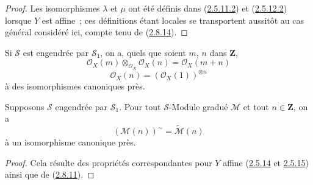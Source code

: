 \begin{proof}
Les isomorphismes $\lambda$ et $\mu$ ont été définis dans
(\hyperref[II.2.5.11.2-fr]{2.5.11.2}) et
(\hyperref[II.2.5.12.2-fr]{2.5.12.2}) lorsque $Y$ est affine~; ces définitions
étant locales se transportent aussitôt au cas général considéré ici, compte
tenu de (\hyperref[II.2.8.14-fr]{2.8.14}).
\end{proof}

\begin{corollary}[3.2.7]
\label{II.3.2.7-fr}
Si $\mathcal{S}$ est engendrée par $\mathcal{S}_1$, on a, quels que soient
$m$, $n$ dans $\mathbf{Z}$,
\[
\label{II.3.2.7.1-fr}
  \mathcal{O}_X(m)\otimes_{\mathcal{O}_X}\mathcal{O}_X(n)
  =\mathcal{O}_X(m+n)
\tag{3.2.7.1}
\]
\[
\label{II.3.2.7.2-fr}
  \mathcal{O}_X(n)=(\mathcal{O}_X(1))^{\otimes n}
\tag{3.2.7.2}
\]
à des isomorphismes canoniques près.
\end{corollary}


\begin{corollary}[3.2.8]
\label{II.3.2.8-fr}
Supposons $\mathcal{S}$ engendrée par $\mathcal{S}_1$. Pour tout
$\mathcal{S}$-Module gradué $\mathcal{M}$ et tout $n\in\mathbf{Z}$, on a
\[
\label{II.3.2.8.1-fr}
  (\mathcal{M}(n))^{\sim}=\widetilde{\mathcal{M}}(n)
\tag{3.2.8.1}
\]
à un isomorphisme canonique près.
\end{corollary}

\begin{proof}
Cela résulte des propriétés correspondantes pour $Y$ affine
(\hyperref[II.2.5.14-fr]{2.5.14} et
\hyperref[II.2.5.15-fr]{2.5.15}) ainsi que de
(\hyperref[II.2.8.11-fr]{2.8.11}).
\end{proof}

